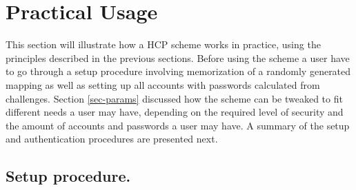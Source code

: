 \section{Practical Usage}\label{usage}
This section will illustrate how a HCP scheme works in practice, using the principles described in the previous sections. Before using the scheme a user have to go through a setup procedure involving memorization of a randomly generated mapping as well as setting up all accounts with passwords calculated from challenges. Section \ref{sec-params} discussed how the scheme can be tweaked to fit different needs a user may have, depending on the required level of security and the amount of accounts and passwords a user may have. A summary of the setup and authentication procedures are presented next.
\subsection{Setup procedure.}
